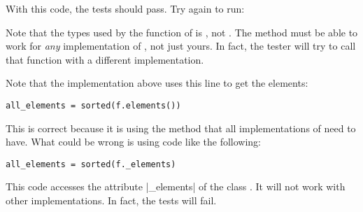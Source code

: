 \begin{longcode}
    \caption{}
    \label{lst:act4e_book_examples.f2}
\end{longcode}

With this code, the tests should pass.
Try again to run:


Note that the types used by the function  of  is \FiniteSet,
not .
The method must be able to work for \emph{any} implementation of  \FiniteSet,
not just yours.
In fact, the tester will try to call that function with a different implementation.

Note that the implementation above uses this line to get the elements:

\begin{verbatim}
all_elements = sorted(f.elements())
\end{verbatim}

This is correct because it is using the method  that all implementations of \FiniteSet need to have.
What could be wrong is using code like the following:

\begin{verbatim}
all_elements = sorted(f._elements)
\end{verbatim}

This code accesses the attribute \pystr|_elements| of the class .
It will not work with other implementations.
In fact, the tests will fail.
